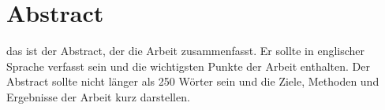 
\chapter*{Abstract}
\label{cha:Abstract}

\thispagestyle{empty} %
\begin{center}
das ist der Abstract, der die Arbeit zusammenfasst. Er sollte in englischer Sprache verfasst sein und die wichtigsten Punkte der Arbeit enthalten. Der Abstract sollte nicht länger als 250 Wörter sein und die Ziele, Methoden und Ergebnisse der Arbeit kurz darstellen.
\end{center}